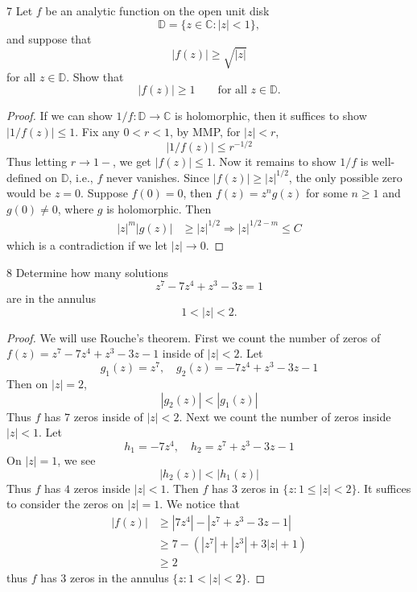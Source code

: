 \documentclass[openany]{book}
\newcommand{\D}{\mathbb{D}}
\begin{document}
\begin{prob}{7}
Let $f$ be an analytic function on the open unit disk
\[
\mathbb{D}=\{z\in\mathbb{C}:|z|<1\},
\]
and suppose that
\[
|f(z)|\geq \sqrt{|z|}
\]
for all $z\in\mathbb{D}$. Show that
\[
|f(z)|\geq 1
\qquad\text{for all }z\in\mathbb{D}.
\]
\end{prob}
\begin{proof}
    If we can show $1/f:\D\to\mathbb{C}$ is holomorphic, then it suffices to show $|1/f(z)|\leq 1$. Fix any $0<r<1$, by MMP, for $|z|<r$, 
    \begin{equation*}
        |1/f(z)|\leq r^{-1/2}
    \end{equation*}
    Thus letting $r\to 1-$, we get $|f(z)|\leq 1$. Now it remains to show $1/f$ is well-defined on $\D$, i.e., $f$ never vanishes. Since $|f(z)|\geq|z|^{1/2}$, the only possible zero would be $z=0$. Suppose $f(0)=0$, then $f(z)=z^ng(z)$ for some $n\geq 1$ and $g(0)\neq 0$, where $g$ is holomorphic. Then 
    \begin{align*}
        |z|^m|g(z)|&\geq|z|^{1/2}\Rightarrow |z|^{1/2-m}\leq C
    \end{align*}
    which is a contradiction if we let $|z|\to 0$.
\end{proof}

\begin{prob}{8}
Determine how many solutions
\[
z^7-7z^4+z^3-3z=1
\]
are in the annulus
\[
1<|z|<2.
\]
\end{prob}
\begin{proof}
    We will use Rouche's theorem. First we count the number of zeros of $f(z)=z^7-7z^4+z^3-3z-1$ inside of $|z|<2$. Let 
    \begin{equation*}
        g_1(z)=z^7, \quad g_2(z)=-7z^4+z^3-3z-1
    \end{equation*}
    Then on $|z|=2$, 
    \begin{equation*}
        |g_2(z)|<|g_1(z)|
    \end{equation*}
    Thus $f$ has $7$ zeros inside of $|z|<2$. Next we count the number of zeros inside $|z|<1$. Let 
    \begin{equation*}
        h_1=-7z^4, \quad h_2=z^7+z^3-3z-1
    \end{equation*}
    On $|z|=1$, we see 
    \begin{equation*}
        |h_2(z)|<|h_1(z)|
    \end{equation*}
    Thus $f$ has $4$ zeros inside $|z|<1$. Then $f$ has $3$ zeros in $\{z: 1\leq |z|<2\}$. It suffices to consider the zeros on $|z|=1$. We notice that 
    \begin{align*}
        |f(z)|&\geq |7z^4|-|z^7+z^3-3z-1|\\
        &\geq 7-\left(|z^7|+|z^3|+3|z|+1\right)\\
        &\geq 2
    \end{align*}
    thus $f$ has $3$ zeros in the annulus $\{z: 1<|z|<2\}$.
\end{proof}
\end{document}
